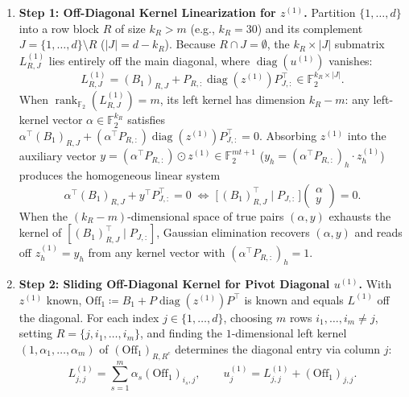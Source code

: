 \documentclass[11pt,a4paper]{article}
\theoremstyle{definition}
\theoremstyle{remark}
\newcommand{\F}{\mathbb{F}}
\newcommand{\rk}{\operatorname{rank}}
\newcommand{\diag}{\operatorname{diag}}
\begin{document}
\begin{enumerate}[leftmargin=2em]
    \item \textbf{Step 1: Off-Diagonal Kernel Linearization for $z^{(1)}$.}
    Partition $\{1, \dots, d\}$ into a row block $R$ of size $k_R > m$ (e.g., $k_R = 30$) and its complement $J = \{1, \dots, d\} \setminus R$ ($|J| = d - k_R$). Because $R \cap J = \emptyset$, the $k_R \times |J|$ submatrix $L^{(1)}_{R, J}$ lies entirely off the main diagonal, where $\diag(u^{(1)})$ vanishes:
    \begin{equation}
    \label{eq:off-diag-block}
        L^{(1)}_{R, J} = (B_1)_{R, J} + P_{R, :} \diag(z^{(1)}) P_{J, :}^\top \in \F_2^{k_R \times |J|}.
    \end{equation}
    When $\rk_{\F_2}(L^{(1)}_{R, J}) = m$, its left kernel has dimension $k_R - m$: any left-kernel vector $\alpha \in \F_2^{k_R}$ satisfies $\alpha^\top (B_1)_{R, J} + (\alpha^\top P_{R, :}) \diag(z^{(1)}) P_{J, :}^\top = 0$. Absorbing $z^{(1)}$ into the auxiliary vector $y = (\alpha^\top P_{R, :}) \odot z^{(1)} \in \F_2^{mt+1}$ ($y_h = (\alpha^\top P_{R, :})_h \cdot z^{(1)}_h$) produces the homogeneous linear system
    \begin{equation}
    \label{eq:z-linearized}
        \alpha^\top (B_1)_{R, J} + y^\top P_{J, :}^\top = 0
        \;\iff\;
        \big[\, (B_1)_{R, J}^\top \;\big|\; P_{J, :} \,\big] \begin{pmatrix} \alpha \\ y \end{pmatrix} = 0.
    \end{equation}
    When the $(k_R - m)$-dimensional space of true pairs $(\alpha, y)$ exhausts the kernel of $[(B_1)_{R, J}^\top \mid P_{J, :}]$, Gaussian elimination recovers $(\alpha, y)$ and reads off $z^{(1)}_h = y_h$ from any kernel vector with $(\alpha^\top P_{R, :})_h = 1$.

    \item \textbf{Step 2: Sliding Off-Diagonal Kernel for Pivot Diagonal $u^{(1)}$.}
    With $z^{(1)}$ known, $\mathrm{Off}_1 \coloneqq B_1 + P \diag(z^{(1)}) P^\top$ is known and equals $L^{(1)}$ off the diagonal. For each index $j \in \{1, \dots, d\}$, choosing $m$ rows $i_1, \dots, i_m \neq j$, setting $R = \{j, i_1, \dots, i_m\}$, and finding the $1$-dimensional left kernel $(1, \alpha_1, \dots, \alpha_m)$ of $(\mathrm{Off}_1)_{R, R^c}$ determines the diagonal entry via column $j$:
    \begin{equation}
    \label{eq:diag-complete}
        L^{(1)}_{j, j} = \sum_{s=1}^m \alpha_s (\mathrm{Off}_1)_{i_s, j},
        \qquad
        u^{(1)}_j = L^{(1)}_{j, j} + (\mathrm{Off}_1)_{j, j}.
    \end{equation}


\end{enumerate}
\end{document}
